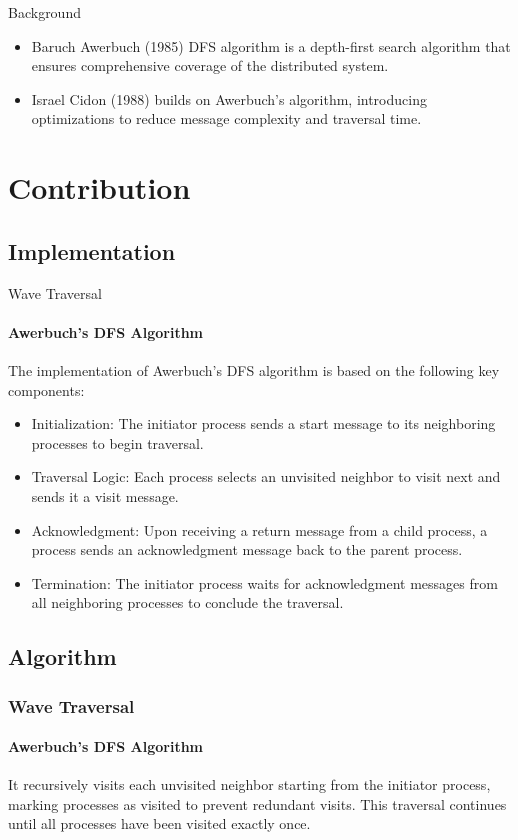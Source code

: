 \documentclass[11pt]{beamer}              %
\begin{document}
\begin{frame}{Background}
\begin{itemize}

\item Baruch Awerbuch (1985) DFS algorithm is a depth-first search algorithm that ensures comprehensive coverage of the distributed system.

\item Israel Cidon (1988) builds on Awerbuch's algorithm, introducing optimizations to reduce message complexity and traversal time.

\end{itemize}

\end{frame}




\section{Contribution}
\subsection{Implementation}
\begin{frame}{Wave Traversal}
\framesubtitle{Awerbuch's DFS Algorithm}
The implementation of Awerbuch's DFS algorithm is based on the following key components:
\begin{itemize}
  \item Initialization: The initiator process sends a start message to its neighboring processes to begin traversal.
  \item Traversal Logic: Each process selects an unvisited neighbor to visit next and sends it a visit message.
  \item Acknowledgment: Upon receiving a return message from a child process, a process sends an acknowledgment message back to the parent process.
  \item Termination: The initiator process waits for acknowledgment messages from all neighboring processes to conclude the traversal.
\end{itemize}
\end{frame}


\subsection{Algorithm}

\begin{frame}
\frametitle{Wave Traversal}
\framesubtitle{Awerbuch's DFS Algorithm}
It recursively visits each unvisited neighbor starting from the initiator process, marking processes as visited to prevent redundant visits.
This traversal continues until all processes have been visited exactly once.
\end{frame}
\end{document}
